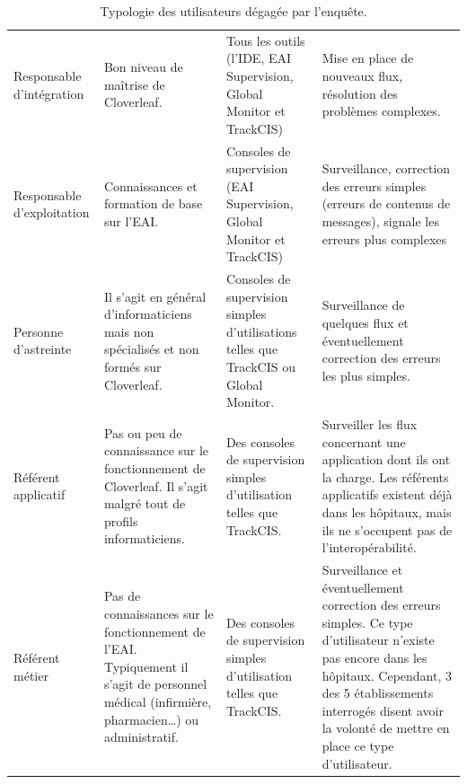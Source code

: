 			\begin{table}[H]
				\centering
				\caption{\label{type_utilisateurs} Typologie des utilisateurs dégagée par
				l'enquête.}
				\begin{tabular}{| p{3cm} | p{4cm} | p{4,5cm} | p{} |}
					\hline
						\thead{Utilisateur}
						&\thead{Niveau de maîtrise}
						&\thead{Outils utilisés}
						&\thead{Rôles}
						\\
					\hline
						Responsable d'intégration
						&
						Bon niveau de maîtrise de Cloverleaf.
						&
						Tous les outils (l'IDE, EAI Supervision, Global Monitor et TrackCIS)
						&
						Mise en place de nouveaux flux, résolution des problèmes complexes.
						\\
					\hline
						Responsable d'exploitation
						&
						Connaissances et formation de base sur l’EAI.
						&
						Consoles de supervision (EAI Supervision, Global Monitor et TrackCIS)
						&
						Surveillance, correction des erreurs simples (erreurs de contenus de
						messages), signale les erreurs plus complexes
						\\
					\hline
						Personne d'astreinte
						&
						Il s'agit en général d'informaticiens mais non spécialisés et non formés
						sur Cloverleaf.
						&
						Consoles de supervision simples d'utilisations telles que TrackCIS ou
						Global Monitor.
						&
						Surveillance de quelques flux et éventuellement correction des erreurs les
						plus simples.
						\\
					\hline
						Référent applicatif
						&
						Pas ou peu de connaissance sur le fonctionnement de Cloverleaf. Il s'agit
						malgré tout de profils informaticiens.
						&
						Des consoles de supervision simples d'utilisation telles que TrackCIS.
						&
						Surveiller les flux concernant une application dont ils ont la charge. Les
						référents applicatifs existent déjà dans les hôpitaux, mais ils ne
						s'occupent pas de l'interopérabilité.
						\\
					\hline
						Référent métier
						&
						Pas de connaissances sur le fonctionnement de l’EAI. Typiquement il s'agit
						de personnel médical (infirmière, pharmacien\ldots) ou administratif.
						&
						Des consoles de supervision simples d'utilisation telles que TrackCIS.
						&
						Surveillance et éventuellement correction des erreurs simples. Ce type
						d'utilisateur n'existe pas encore dans les hôpitaux. Cependant, 3 des 5
						établissements interrogés disent avoir la volonté de mettre en place ce
						type d'utilisateur.
						\\
					\hline
				\end{tabular}
			\end{table}
